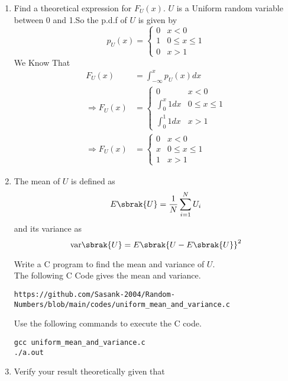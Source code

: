 \documentclass[journal,12pt,twocolumn]{IEEEtran}
\renewcommand\thesection{\arabic{section}}
\begin{document}
\begin{enumerate}[label=\thesection.\arabic*
,ref=\thesection.\theenumi]
%
\item
Find a  theoretical expression for $F_{U}(x)$.
\solution $U$ is a Uniform random variable between 0 and 1.So the p.d.f of $U$ is given by \\
\begin{equation}
    p_U(x) = 
    \begin{cases}
    0 & x < 0 \\
    1 & 0 \le x \le 1 \\
    0 & x > 1 
    \end{cases}
\end{equation}
We Know That 
\begin{align}
    F_U(x) &=  \int_{-\infty}^{x} p_U(x)dx  \\
    \Rightarrow F_U(x) &= 
    \begin{cases}
    0 & x < 0 \\
    \int_{0}^{x} 1dx &  0 \le x \le 1 \\
    \int_{0}^{1} 1dx & x > 1 
    \end{cases} \\
    \Rightarrow F_U(x) &= 
    \begin{cases}
    0 & x < 0 \\
    x &  0 \le x \le 1 \\
    1 & x > 1 
    \end{cases} 
\end{align}
\item
The mean of $U$ is defined as
%
\begin{equation}
E\sbrak{U} = \frac{1}{N}\sum_{i=1}^{N}U_i
\end{equation}
%
and its variance as
%
\begin{equation}
\text{var}\sbrak{U} = E\sbrak{U- E\sbrak{U}}^2 
\end{equation}

Write a C program to  find the mean and variance of $U$. \\
\solution The following C Code gives the mean and variance. 
\begin{lstlisting}
https://github.com/Sasank-2004/Random-Numbers/blob/main/codes/uniform_mean_and_variance.c
\end{lstlisting}
Use the following commands to execute the C code.
\begin{lstlisting}
gcc uniform_mean_and_variance.c
./a.out
\end{lstlisting}
\item Verify your result theoretically given that


\end{enumerate}
\end{document}
